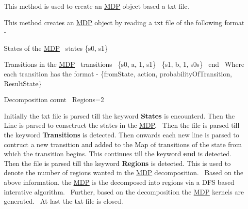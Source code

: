 This method is used to create an \hyperlink{classmdp_1_1core_1_1_m_d_p}{M\+D\+P} object based a txt file. 

This method creates an \hyperlink{classmdp_1_1core_1_1_m_d_p}{M\+D\+P} object by reading a txt file of the following format -\/ ~\newline

\begin{DoxyEnumerate}
\item States of the \hyperlink{classmdp_1_1core_1_1_m_d_p}{M\+D\+P}~\newline
 states \{s0, s1\}~\newline

\item Transitions in the \hyperlink{classmdp_1_1core_1_1_m_d_p}{M\+D\+P}~\newline
 transitions~\newline
 \{s0, a, 1, s1\}~\newline
 \{s1, b, 1, s0s\}~\newline
 end~\newline
 Where each transition has the format -\/ \{from\+State, action, probability\+Of\+Transition, Result\+State\}~\newline

\item Decomposition count~\newline
 Regions=2~\newline
 ~\newline

\end{DoxyEnumerate}

Initially the txt file is parsed till the keyword {\bfseries States} is encounterd. Then the Line is parsed to consctruct the states in the \hyperlink{classmdp_1_1core_1_1_m_d_p}{M\+D\+P}.~\newline
 Then the file is parsed till the keyword {\bfseries Transitions} is detected. Then onwards each new line is parsed to contruct a new transition and added to the Map of transitions of the state from which the transition begins. This continues till the keyword {\bfseries end} is detected.~\newline
 Then the file is parsed till the keyword {\bfseries Regions} is detected. This is used to denote the number of regions wanted in the \hyperlink{classmdp_1_1core_1_1_m_d_p}{M\+D\+P} decomposition.~\newline
 Based on the above information, the \hyperlink{classmdp_1_1core_1_1_m_d_p}{M\+D\+P} is the decomposed into regions via a D\+F\+S based interative algorithm.~\newline
 Further, based on the decomposition the \hyperlink{classmdp_1_1core_1_1_m_d_p}{M\+D\+P} kernels are generated.~\newline
 At last the txt file is closed.~\newline
 

